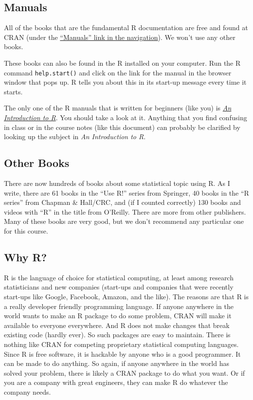 \documentclass[
]{article}
\begin{document}
\hypertarget{manuals}{%
\subsection{Manuals}\label{manuals}}

All of the books that are the fundamental R documentation are free and
found at CRAN (under the
\href{https://cloud.r-project.org/manuals.html}{``Manuals'' link in the
navigation}). We won't use any other books.

These books can also be found in the R installed on your computer. Run
the R command \texttt{help.start()} and click on the link for the manual
in the browser window that pops up. R tells you about this in its
start-up message every time it starts.

The only one of the R manuals that is written for beginners (like you)
is
\href{https://cloud.r-project.org/doc/manuals/r-release/R-intro.html}{\emph{An
Introduction to R}}. You should take a look at it. Anything that you
find confusing in class or in the course notes (like this document) can
probably be clarified by looking up the subject in \emph{An Introduction
to R}.

\hypertarget{other-books}{%
\subsection{Other Books}\label{other-books}}

There are now hundreds of books about some statistical topic using R. As
I write, there are 61 books in the ``Use R!'' series from Springer, 40
books in the ``R series'' from Chapman \& Hall/CRC, and (if I counted
correctly) 130 books and videos with ``R'' in the title from O'Reilly.
There are more from other publishers. Many of these books are very good,
but we don't recommend any particular one for this course.

\hypertarget{why-r}{%
\subsection{Why R?}\label{why-r}}

R is the language of choice for statistical computing, at least among
research statisticians and new companies (start-ups and companies that
were recently start-ups like Google, Facebook, Amazon, and the like).
The reasons are that R is a really developer friendly programming
language. If anyone anywhere in the world wants to make an R package to
do some problem, CRAN will make it available to everyone everywhere. And
R does not make changes that break existing code (hardly ever). So such
packages are easy to maintain. There is nothing like CRAN for competing
proprietary statistical computing languages. Since R is free software,
it is hackable by anyone who is a good programmer. It can be made to do
anything. So again, if anyone anywhere in the world has solved your
problem, there is likely a CRAN package to do what you want. Or if you
are a company with great engineers, they can make R do whatever the
company needs.
\end{document}
